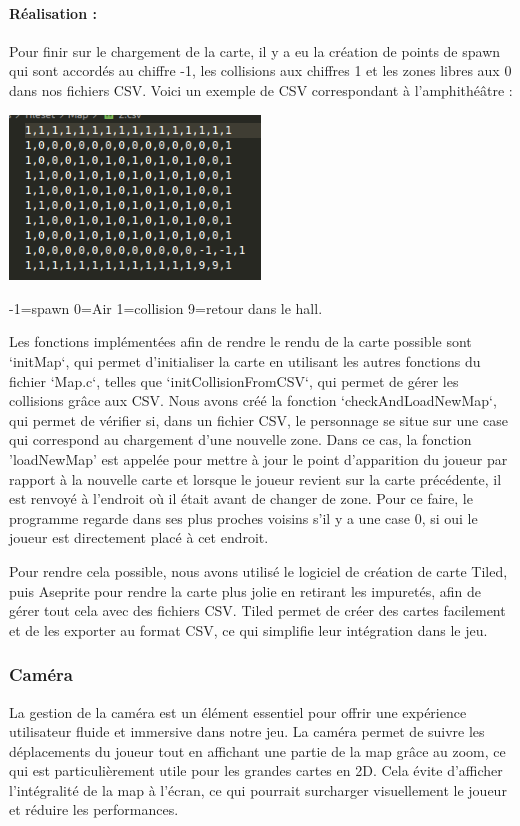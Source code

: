 \documentclass[12pt,a4paper, twoside]{article}
\begin{document}
    \paragraph{Réalisation : }
    Pour finir sur le chargement de la carte, il y a eu la création de points de spawn qui sont accordés au chiffre -1, les collisions aux chiffres 1 et les zones libres aux 0 dans nos fichiers CSV. 
    Voici un exemple de CSV correspondant à l'amphithéâtre :
    \begin{center}
    \includegraphics[width=0.5\textwidth]{hall.png}
    \end{center}
    \begin{center}
        \small{-1=spawn 0=Air 1=collision 9=retour dans le hall.}
    \end{center}
    
    Les fonctions implémentées afin de rendre le rendu de la carte possible sont `initMap`, qui permet d'initialiser la carte en utilisant les autres fonctions du fichier `Map.c`, telles que `initCollisionFromCSV`,
    qui permet de gérer les collisions grâce aux CSV. Nous avons créé la fonction `checkAndLoadNewMap`, qui permet de vérifier si, dans un fichier CSV, le personnage se situe sur une case qui correspond au chargement d'une nouvelle zone. Dans ce cas, 
    la fonction 'loadNewMap' est appelée pour mettre à jour le point d'apparition du joueur par rapport à la nouvelle carte et lorsque le joueur revient sur la carte précédente, il est renvoyé à l'endroit où il était avant de changer de zone.
    Pour ce faire, le programme regarde dans ses plus proches voisins s'il y a une case 0, si oui le joueur est directement placé à cet endroit.

    Pour rendre cela possible, nous avons utilisé le logiciel de création de carte Tiled, puis Aseprite pour rendre la carte plus jolie en retirant les impuretés, afin de gérer tout cela avec des fichiers CSV.
    Tiled permet de créer des cartes facilement et de les exporter au format CSV, ce qui simplifie leur intégration dans le jeu.
    \subsubsection{Caméra}
    La gestion de la caméra est un élément essentiel pour offrir une expérience utilisateur fluide et immersive dans notre jeu. La caméra permet de suivre les déplacements du joueur tout en affichant une partie de la map grâce au zoom, ce qui est particulièrement utile pour les grandes cartes en 2D. Cela évite d'afficher l'intégralité de la map à l'écran, ce qui pourrait surcharger visuellement le joueur et réduire les performances.
\end{document}
